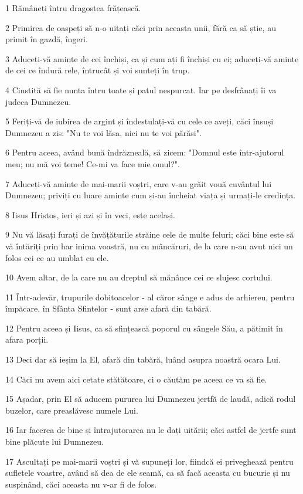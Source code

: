 \par 1 Rămâneți întru dragostea frățească.
\par 2 Primirea de oaspeți să n-o uitați căci prin aceasta unii, fără ca să știe, au primit în gazdă, îngeri.
\par 3 Aduceți-vă aminte de cei închiși, ca și cum ați fi închiși cu ei; aduceți-vă aminte de cei ce îndură rele, întrucât și voi sunteți în trup.
\par 4 Cinstită să fie nunta întru toate și patul nespurcat. Iar pe desfrânați îi va judeca Dumnezeu.
\par 5 Feriți-vă de iubirea de argint și îndestulați-vă cu cele ce aveți, căci însuși Dumnezeu a zis: "Nu te voi lăsa, nici nu te voi părăsi".
\par 6 Pentru aceea, având bună îndrăzneală, să zicem: "Domnul este într-ajutorul meu; nu mă voi teme! Ce-mi va face mie omul?".
\par 7 Aduceți-vă aminte de mai-marii voștri, care v-au grăit vouă cuvântul lui Dumnezeu; priviți cu luare aminte cum și-au încheiat viața și urmați-le credința.
\par 8 Iisus Hristos, ieri și azi și în veci, este același.
\par 9 Nu vă lăsați furați de învățăturile străine cele de multe feluri; căci bine este să vă întăriți prin har inima voastră, nu cu mâncăruri, de la care n-au avut nici un folos cei ce au umblat cu ele.
\par 10 Avem altar, de la care nu au dreptul să mănânce cei ce slujesc cortului.
\par 11 Într-adevăr, trupurile dobitoacelor - al căror sânge e adus de arhiereu, pentru împăcare, în Sfânta Sfintelor - sunt arse afară din tabără.
\par 12 Pentru aceea și Iisus, ca să sfințească poporul cu sângele Său, a pătimit în afara porții.
\par 13 Deci dar să ieșim la El, afară din tabără, luând asupra noastră ocara Lui.
\par 14 Căci nu avem aici cetate stătătoare, ci o căutăm pe aceea ce va să fie.
\par 15 Așadar, prin El să aducem pururea lui Dumnezeu jertfă de laudă, adică rodul buzelor, care preaslăvesc numele Lui.
\par 16 Iar facerea de bine și întrajutorarea nu le dați uitării; căci astfel de jertfe sunt bine plăcute lui Dumnezeu.
\par 17 Ascultați pe mai-marii voștri și vă supuneți lor, fiindcă ei priveghează pentru sufletele voastre, având să dea de ele seamă, ca să facă aceasta cu bucurie și nu suspinând, căci aceasta nu v-ar fi de folos.
